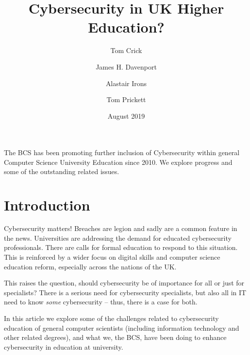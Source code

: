 \documentclass[a4paper,11pt]{article}
\title{Cybersecurity in UK Higher Education?}
\author[1]{Tom Crick}
\author[2]{James H. Davenport}
\author[3]{Alastair Irons}
\author[4]{Tom Prickett}
\affil[1]{Swansea University, Swansea, UK}
\affil[2]{University of Bath, Bath, UK}
\affil[3]{Sunderland University, Sunderland, UK}
\affil[4]{Northumbria University, Newcastle upon Tyne, UK}
\affil[1]{\url{thomas.crick@swansea.ac.uk}}
\affil[2]{\url{j.h.davenport@bath.ac.uk}}
\affil[3]{\url{alastair.irons@sunderland.ac.uk}}
\affil[4]{\url{tom.prickett@northumbria.ac.uk}}
\date{August 2019}
\begin{document}
\maketitle


\begin{strapline}
The BCS has been promoting further inclusion of Cybersecurity within general Computer Science University Education since 2010. We explore progress and some of the outstanding related issues.

\end{strapline}




\section*{Introduction}

Cybersecurity matters! Breaches are legion and sadly are a common feature in the news. Universities are  addressing the demand for educated cybersecurity professionals.  There are calls for formal education to respond to this situation. This is reinforced by a wider focus on digital skills and computer science education reform, especially across the nations of the UK. 

This raises the question, should cybersecurity be of importance for all or just for specialists? There is a serious need for cybersecurity specialists, but also all in IT need to know \emph{some} cybersecurity -- thus, there is a case for both. 

In this article we explore some of the challenges related to cybersecurity education of general computer scientists (including information technology and other related degrees), and what we, the BCS, have been doing to enhance cybersecurity in education at university.


\end{document}
